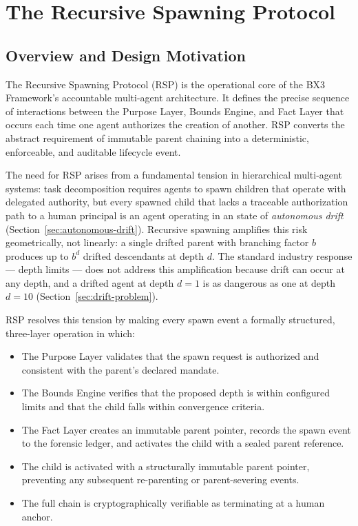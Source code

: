 \section{The Recursive Spawning Protocol}
\label{sec:recursive-spawning-protocol}

\subsection{Overview and Design Motivation}

The Recursive Spawning Protocol (RSP) is the operational core of the BX3 Framework's accountable multi-agent architecture. It defines the precise sequence of interactions between the Purpose Layer, Bounds Engine, and Fact Layer that occurs each time one agent authorizes the creation of another. RSP converts the abstract requirement of immutable parent chaining into a deterministic, enforceable, and auditable lifecycle event.

The need for RSP arises from a fundamental tension in hierarchical multi-agent systems: task decomposition requires agents to spawn children that operate with delegated authority, but every spawned child that lacks a traceable authorization path to a human principal is an agent operating in an state of \emph{autonomous drift} (Section~\ref{sec:autonomous-drift}). Recursive spawning amplifies this risk geometrically, not linearly: a single drifted parent with branching factor $b$ produces up to $b^d$ drifted descendants at depth $d$. The standard industry response — depth limits — does not address this amplification because drift can occur at any depth, and a drifted agent at depth $d=1$ is as dangerous as one at depth $d=10$ (Section~\ref{sec:drift-problem}).

RSP resolves this tension by making every spawn event a formally structured, three-layer operation in which:

\begin{itemize}
    \item The Purpose Layer validates that the spawn request is authorized and consistent with the parent's declared mandate.
    \item The Bounds Engine verifies that the proposed depth is within configured limits and that the child falls within convergence criteria.
    \item The Fact Layer creates an immutable parent pointer, records the spawn event to the forensic ledger, and activates the child with a sealed parent reference.
    \item The child is activated with a structurally immutable parent pointer, preventing any subsequent re-parenting or parent-severing events.
    \item The full chain is cryptographically verifiable as terminating at a human anchor.
\end{itemize}

